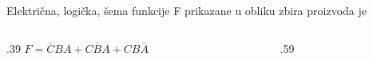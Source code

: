 \begin{frame}[label=02-s019]
Električna, logička, šema funkcije F prikazane u obliku zbira proizvoda je
\begin{columns}[c,onlytextwidth]
\begin{column}{.39\textwidth}\centering
\(F=\bar CBA+C\bar BA+CB\bar A\)
\end{column}
\begin{column}{.59\textwidth}\centering

\end{column}
\end{columns}
\end{frame}
